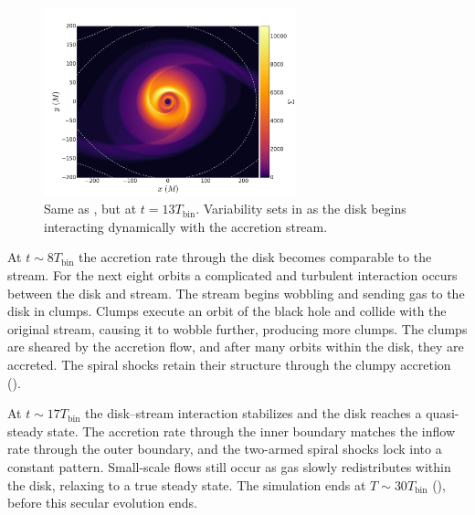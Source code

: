 \begin{figure}
\begin{center}
\includegraphics[width=0.65\textwidth]{figures/minidisk/q011_m3_sig_1300.pdf}
\end{center}
\caption{ Same as , but at $t = 13 T_\text{bin}$.  Variability sets in as the disk begins interacting dynamically with the accretion stream.}
\end{figure}


At $t\sim 8 T_\text{bin}$ the accretion rate through the disk becomes comparable to the stream.  For the next eight orbits a complicated and turbulent interaction occurs between the disk and stream.  The stream begins wobbling and sending gas to the disk in clumps.  Clumps execute an orbit of the black hole and collide with the original stream, causing it to wobble further, producing more clumps.  The clumps are sheared by the accretion flow, and after many orbits within the disk, they are accreted. The spiral shocks retain their structure through the clumpy accretion ().

At $t\sim17 T_\text{bin}$ the disk--stream interaction stabilizes and the disk reaches a quasi-steady state.  The accretion rate through the inner boundary matches the inflow rate through the outer boundary, and the two-armed spiral shocks lock into a constant pattern.  Small-scale flows still occur as gas slowly redistributes within the disk, relaxing to a true steady state.  The simulation ends at $T\sim30 T_\text{bin}$ (), before this secular evolution ends.

